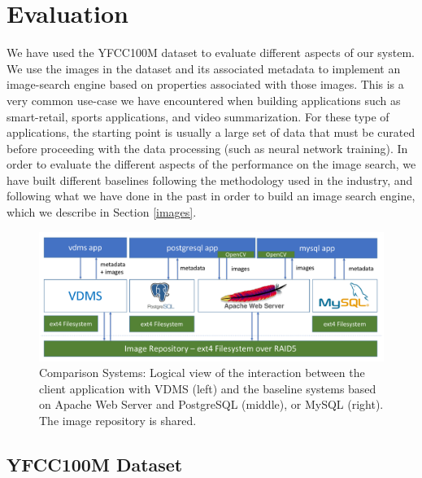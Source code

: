 \section{Evaluation}
\label{eval}

We have used the YFCC100M dataset to evaluate different aspects of our system.
We use the images in the dataset and its associated metadata to implement
an image-search engine based on properties associated with those images.
This is a very common use-case we have encountered when building
applications such as smart-retail, sports applications, and video summarization.
For these type of applications, the starting point is usually
a large set of data that must be curated
before proceeding with the data processing (such as neural network training).
In order to evaluate the different aspects of the performance on the
image search, we have built different baselines following the methodology
used in the industry, and following what we have done in the past
in order to build an image search engine, which we describe in Section \ref{images}.

\begin{figure}
\centering
\includegraphics[width=\textwidth]{figures/comparison_system}
\caption{Comparison Systems: Logical view of the interaction between the client application with VDMS (left) and the baseline systems based on Apache Web Server and PostgreSQL (middle), or MySQL (right). The image repository is shared.}
\label{fig:systems}
\end{figure}

\subsection{YFCC100M Dataset}
\label{dataset}

